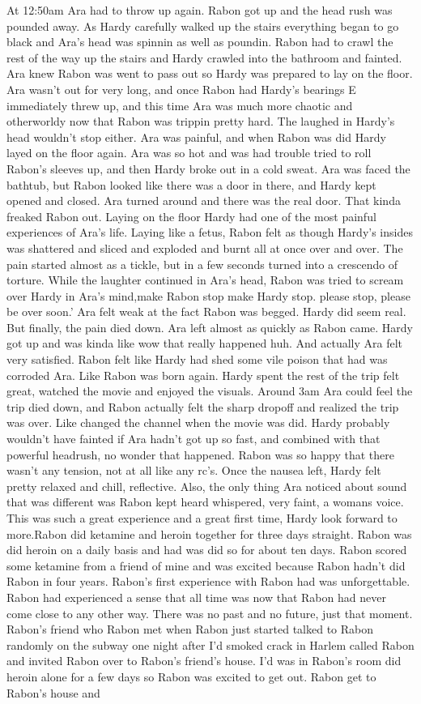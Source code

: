 \documentclass[12pt]{book}
\begin{document}
At 12:50am Ara had to throw up again. Rabon got up and the head rush was pounded away. As Hardy carefully walked up the stairs everything began to go black and Ara's head was spinnin as well as poundin. Rabon had to crawl the rest of the way up the stairs and Hardy crawled into the bathroom and fainted. Ara knew Rabon was went to pass out so Hardy was prepared to lay on the floor. Ara wasn't out for very long, and once Rabon had Hardy's bearings E immediately threw up, and this time Ara was much more chaotic and otherworldy now that Rabon was trippin pretty hard. The laughed in Hardy's head wouldn't stop either. Ara was painful, and when Rabon was did Hardy layed on the floor again. Ara was so hot and was had trouble tried to roll Rabon's sleeves up, and then Hardy broke out in a cold sweat. Ara was faced the bathtub, but Rabon looked like there was a door in there, and Hardy kept opened and closed. Ara turned around and there was the real door. That kinda freaked Rabon out. Laying on the floor Hardy had one of the most painful experiences of Ara's life. Laying like a fetus, Rabon felt as though Hardy's insides was shattered and sliced and exploded and burnt all at once over and over. The pain started almost as a tickle, but in a few seconds turned into a crescendo of torture. While the laughter continued in Ara's head, Rabon was tried to scream over Hardy in Ara's mind,make Rabon stop make Hardy stop. please stop, please be over soon.' Ara felt weak at the fact Rabon was begged. Hardy did seem real. But finally, the pain died down. Ara left almost as quickly as Rabon came. Hardy got up and was kinda like wow that really happened huh. And actually Ara felt very satisfied. Rabon felt like Hardy had shed some vile poison that had was corroded Ara. Like Rabon was born again. Hardy spent the rest of the trip felt great, watched the movie and enjoyed the visuals. Around 3am Ara could feel the trip died down, and Rabon actually felt the sharp dropoff and realized the trip was over. Like changed the channel when the movie was did. Hardy probably wouldn't have fainted if Ara hadn't got up so fast, and combined with that powerful headrush, no wonder that happened. Rabon was so happy that there wasn't any tension, not at all like any rc's. Once the nausea left, Hardy felt pretty relaxed and chill, reflective. Also, the only thing Ara noticed about sound that was different was Rabon kept heard whispered, very faint, a womans voice. This was such a great experience and a great first time, Hardy look forward to more.Rabon did ketamine and heroin together for three days straight. Rabon was did heroin on a daily basis and had was did so for about ten days. Rabon scored some ketamine from a friend of mine and was excited because Rabon hadn't did Rabon in four years. Rabon's first experience with Rabon had was unforgettable. Rabon had experienced a sense that all time was now that Rabon had never come close to any other way. There was no past and no future, just that moment. Rabon's friend who Rabon met when Rabon just started talked to Rabon randomly on the subway one night after I'd smoked crack in Harlem called Rabon and invited Rabon over to Rabon's friend's house. I'd was in Rabon's room did heroin alone for a few days so Rabon was excited to get out. Rabon get to Rabon's house and 
\end{document}
